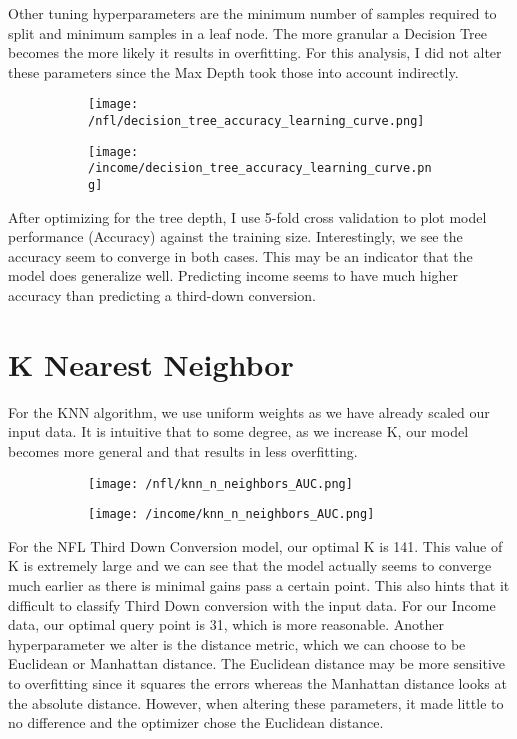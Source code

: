 \documentclass[12pt]{article}
\begin{document}
Other tuning hyperparameters are the minimum number of samples required to split and minimum samples in a leaf node. The more granular a Decision Tree becomes the more likely it results in overfitting. For this analysis, I did not alter these parameters since the Max Depth took those into account indirectly. 

\begin{figure}[H]
\begin{subfigure}{0.5\textwidth}
\centering
\texttt{[image: /nfl/decision\_tree\_accuracy\_learning\_curve.png]}
\end{subfigure}%
\begin{subfigure}{0.5\textwidth}
\centering
\texttt{[image: /income/decision\_tree\_accuracy\_learning\_curve.png]}
\end{subfigure}
\end{figure}

After optimizing for the tree depth, I use 5-fold cross validation to plot model performance (Accuracy) against the training size. Interestingly, we see the accuracy seem to converge in both cases. This may be an indicator that the model does generalize well.  Predicting income seems to have much higher accuracy than predicting a third-down conversion.

\section{K Nearest Neighbor}
For the KNN algorithm, we use uniform weights as we have already scaled our input data. It is intuitive that to some degree, as we increase K, our model becomes more general and that results in less overfitting.

\begin{figure}[h]
\begin{subfigure}{0.5\textwidth}
\centering
\texttt{[image: /nfl/knn\_n\_neighbors\_AUC.png]}
\end{subfigure}%
\begin{subfigure}{0.5\textwidth}
\centering
\texttt{[image: /income/knn\_n\_neighbors\_AUC.png]}
\end{subfigure}
\end{figure}

For the NFL Third Down Conversion model, our optimal K is 141. This value of K is extremely large and we can see that the model actually seems to converge much earlier as there is minimal gains pass a certain point. This also hints that  it difficult to classify Third Down conversion with the input data.  For our Income data, our optimal query point is 31, which is more reasonable. Another hyperparameter we alter is the distance metric, which we can choose to be Euclidean or Manhattan distance.  The Euclidean distance may be more sensitive to overfitting since it squares the errors whereas the Manhattan distance looks at the absolute distance. However, when altering these parameters, it made little to no difference and the optimizer chose the Euclidean distance.
\end{document}
